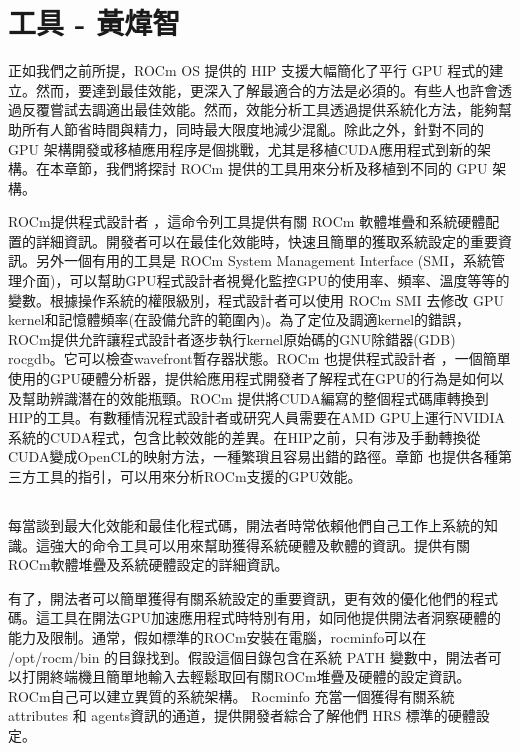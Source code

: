 \titleformat{\subsection}{\large\bfseries\CJKsection}{\thesubsection}{1em}{}

\chapter{ 工具 - 黃煒智}
\label{chap:HIP Tools}

正如我們之前所提，ROCm OS 提供的 HIP 支援大幅簡化了平行 GPU 程式的建立。然而，要達到最佳效能，更深入了解最適合的方法是必須的。有些人也許會透過反覆嘗試去調適出最佳效能。然而，效能分析工具透過提供系統化方法，能夠幫助所有人節省時間與精力，同時最大限度地減少混亂。除此之外，針對不同的 GPU 架構開發或移植應用程序是個挑戰，尤其是移植CUDA應用程式到新的架構。在本章節，我們將探討 ROCm 提供的工具用來分析及移植到不同的 GPU 架構。

ROCm提供程式設計者 ，這命令列工具提供有關 ROCm 軟體堆疊和系統硬體配置的詳細資訊。開發者可以在最佳化效能時，快速且簡單的獲取系統設定的重要資訊。另外一個有用的工具是 ROCm System Management Interface (SMI，系統管理介面)，可以幫助GPU程式設計者視覺化監控GPU的使用率、頻率、溫度等等的變數。根據操作系統的權限級別，程式設計者可以使用 ROCm SMI 去修改 GPU kernel和記憶體頻率(在設備允許的範圍內)。為了定位及調適kernel的錯誤，ROCm提供允許讓程式設計者逐步執行kernel原始碼的GNU除錯器(GDB) rocgdb。它可以檢查wavefront暫存器狀態。ROCm 也提供程式設計者 ，一個簡單使用的GPU硬體分析器，提供給應用程式開發者了解程式在GPU的行為是如何以及幫助辨識潛在的效能瓶頸。ROCm 提供將CUDA編寫的整個程式碼庫轉換到HIP的工具。有數種情況程式設計者或研究人員需要在AMD GPU上運行NVIDIA系統的CUDA程式，包含比較效能的差異。在HIP之前，只有涉及手動轉換從CUDA變成OpenCL的映射方法，一種繁瑣且容易出錯的路徑。章節  也提供各種第三方工具的指引，可以用來分析ROCm支援的GPU效能。

\section{}

每當談到最大化效能和最佳化程式碼，開法者時常依賴他們自己工作上系統的知識。這強大的命令工具可以用來幫助獲得系統硬體及軟體的資訊。提供有關ROCm軟體堆疊及系統硬體設定的詳細資訊。

有了，開法者可以簡單獲得有關系統設定的重要資訊，更有效的優化他們的程式碼。這工具在開法GPU加速應用程式時特別有用，如同他提供開法者洞察硬體的能力及限制。通常，假如標準的ROCm安裝在電腦，rocminfo可以在 /opt/rocm/bin 的目錄找到。假設這個目錄包含在系統 PATH 變數中，開法者可以打開終端機且簡單地輸入去輕鬆取回有關ROCm堆疊及硬體的設定資訊。ROCm自己可以建立異質的系統架構。 Rocminfo 充當一個獲得有關系統 attributes 和 agents資訊的通道，提供開發者綜合了解他們 HRS 標準的硬體設定。

